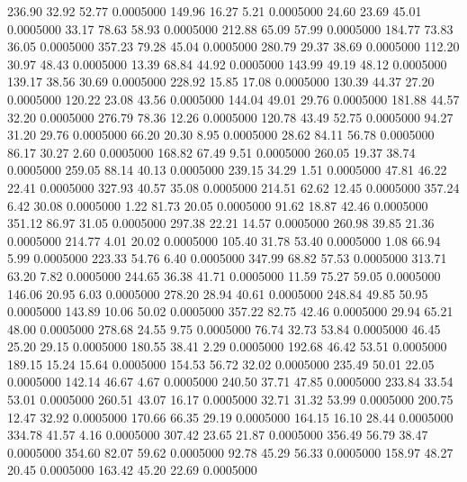  236.90   32.92   52.77   0.0005000
 149.96   16.27    5.21   0.0005000
  24.60   23.69   45.01   0.0005000
  33.17   78.63   58.93   0.0005000
 212.88   65.09   57.99   0.0005000
 184.77   73.83   36.05   0.0005000
 357.23   79.28   45.04   0.0005000
 280.79   29.37   38.69   0.0005000
 112.20   30.97   48.43   0.0005000
  13.39   68.84   44.92   0.0005000
 143.99   49.19   48.12   0.0005000
 139.17   38.56   30.69   0.0005000
 228.92   15.85   17.08   0.0005000
 130.39   44.37   27.20   0.0005000
 120.22   23.08   43.56   0.0005000
 144.04   49.01   29.76   0.0005000
 181.88   44.57   32.20   0.0005000
 276.79   78.36   12.26   0.0005000
 120.78   43.49   52.75   0.0005000
  94.27   31.20   29.76   0.0005000
  66.20   20.30    8.95   0.0005000
  28.62   84.11   56.78   0.0005000
  86.17   30.27    2.60   0.0005000
 168.82   67.49    9.51   0.0005000
 260.05   19.37   38.74   0.0005000
 259.05   88.14   40.13   0.0005000
 239.15   34.29    1.51   0.0005000
  47.81   46.22   22.41   0.0005000
 327.93   40.57   35.08   0.0005000
 214.51   62.62   12.45   0.0005000
 357.24    6.42   30.08   0.0005000
   1.22   81.73   20.05   0.0005000
  91.62   18.87   42.46   0.0005000
 351.12   86.97   31.05   0.0005000
 297.38   22.21   14.57   0.0005000
 260.98   39.85   21.36   0.0005000
 214.77    4.01   20.02   0.0005000
 105.40   31.78   53.40   0.0005000
   1.08   66.94    5.99   0.0005000
 223.33   54.76    6.40   0.0005000
 347.99   68.82   57.53   0.0005000
 313.71   63.20    7.82   0.0005000
 244.65   36.38   41.71   0.0005000
  11.59   75.27   59.05   0.0005000
 146.06   20.95    6.03   0.0005000
 278.20   28.94   40.61   0.0005000
 248.84   49.85   50.95   0.0005000
 143.89   10.06   50.02   0.0005000
 357.22   82.75   42.46   0.0005000
  29.94   65.21   48.00   0.0005000
 278.68   24.55    9.75   0.0005000
  76.74   32.73   53.84   0.0005000
  46.45   25.20   29.15   0.0005000
 180.55   38.41    2.29   0.0005000
 192.68   46.42   53.51   0.0005000
 189.15   15.24   15.64   0.0005000
 154.53   56.72   32.02   0.0005000
 235.49   50.01   22.05   0.0005000
 142.14   46.67    4.67   0.0005000
 240.50   37.71   47.85   0.0005000
 233.84   33.54   53.01   0.0005000
 260.51   43.07   16.17   0.0005000
  32.71   31.32   53.99   0.0005000
 200.75   12.47   32.92   0.0005000
 170.66   66.35   29.19   0.0005000
 164.15   16.10   28.44   0.0005000
 334.78   41.57    4.16   0.0005000
 307.42   23.65   21.87   0.0005000
 356.49   56.79   38.47   0.0005000
 354.60   82.07   59.62   0.0005000
  92.78   45.29   56.33   0.0005000
 158.97   48.27   20.45   0.0005000
 163.42   45.20   22.69   0.0005000
